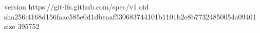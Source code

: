 version https://git-lfs.github.com/spec/v1
oid sha256:4168d156faac585e0d1dbeaaf530683744101b1101b2e8b77324850054a09401
size 395752
